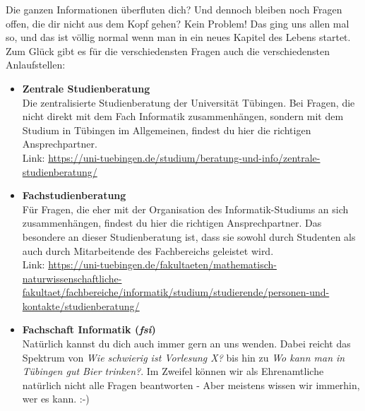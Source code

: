     Die ganzen Informationen überfluten dich? Und dennoch bleiben noch Fragen offen, die dir nicht aus dem Kopf gehen?
    Kein Problem! Das ging uns allen mal so, und das ist völlig normal wenn man in ein neues Kapitel des Lebens startet.
    Zum Glück gibt es für die verschiedensten Fragen auch die verschiedensten Anlaufstellen:
    \begin{itemize}
        \item \textbf{Zentrale Studienberatung}\\
            Die zentralisierte Studienberatung der Universität Tübingen. Bei Fragen, die nicht direkt mit dem Fach Informatik zusammenhängen,
            sondern mit dem Studium in Tübingen im Allgemeinen, findest du hier die richtigen Ansprechpartner. \\
            Link: \url{https://uni-tuebingen.de/studium/beratung-und-info/zentrale-studienberatung/}
        \item \textbf{Fachstudienberatung}\\
            Für Fragen, die eher mit der Organisation des Informatik-Studiums an sich zusammenhängen, 
            findest du hier die richtigen Ansprechpartner. Das besondere an dieser Studienberatung ist,
            dass sie sowohl durch Studenten als auch durch Mitarbeitende des Fachbereichs geleistet wird. \\
            Link: \url{https://uni-tuebingen.de/fakultaeten/mathematisch-naturwissenschaftliche-fakultaet/fachbereiche/informatik/studium/studierende/personen-und-kontakte/studienberatung/}
        \item \textbf{Fachschaft Informatik (\textit{fsi})}\\
            Natürlich kannst du dich auch immer gern an uns wenden. Dabei reicht das Spektrum von \textit{Wie schwierig ist Vorlesung X?} 
            bis hin zu \textit{Wo kann man in Tübingen gut Bier trinken?}. Im Zweifel können wir als Ehrenamtliche natürlich nicht alle
            Fragen beantworten - Aber meistens wissen wir immerhin, wer es kann. :-)

    \end{itemize}
\fi
